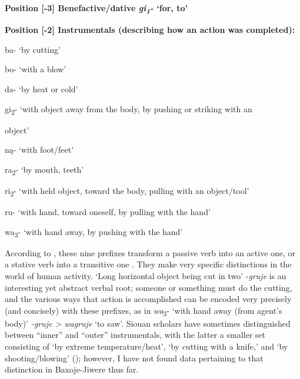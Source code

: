 \documentclass[output=paper]{LSP/langsci}
\begin{document}
\textbf{Position [-3]  Benefactive/dative \textit{gi\textsubscript{1}-} `for, to'}    					         

\vspace{1em}
\textbf{Position [-2]  Instrumentals (describing how an action was completed):}					

\hspace{2em} ba- `by cutting' 
			
\hspace{2em} bo- `with a blow'      	

\hspace{2em} da- `by heat or cold' 	

\hspace{2em} gi\textsubscript{2}- `with object away from the body, by pushing or striking with an 

\hspace{3em} object' 			

\hspace{2em} n\k{a}- `with foot/feet'		

\hspace{2em} ra\textsubscript{2}- `by mouth, teeth'				

\hspace{2em} ri\textsubscript{2}-  `with held object, toward the body, pulling with an object/tool'    		

\hspace{2em} ru- `with hand, toward oneself, by pulling with the hand' 			

\hspace{2em} wa\textsubscript{3}- `with hand away, by pushing with the hand'
\vspace{1em}

According to \citet[246]{Whitman1947}, these nine prefixes transform a passive verb into an active one, or a stative verb into a transitive one \citep[483]{Rankin2005b}. They make very specific distinctions in the world of human activity. `Long horizontal object being cut in two' -\textit{gruje} is an interesting yet abstract verbal root; someone or something must do the cutting, and the various ways that action is accomplished can be encoded very precisely (and concisely) with these prefixes, as in \textit{wa}\textsubscript{3}- `with hand away (from agent's body)' \textit{-gruje > wagruje} `to saw'.  Siouan scholars have sometimes distinguished between ``inner'' and ``outer'' instrumentals, with the latter a smaller set consisting of `by extreme temperature/heat', `by cutting with a knife,' and `by shooting/blowing' (\citealt[483-485]{Rankin2005b}); however, I have not found data pertaining to that distinction in Baxoje-Jiwere thus far.   		
     
\end{document}
